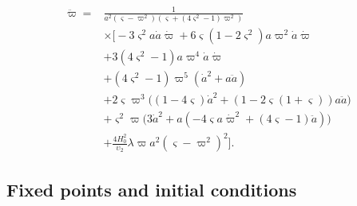 \documentclass[aps,prd,reprint,preprintnumbers,showpacs,floatfix,nofootinbib,superscriptaddress]{revtex4-2}
\newcommand{\cpr}{\varpi}
\begin{document}
\begin{align}
	\ddot{\cpr} ={}& \frac{1}{a^2\left(\varsigma-\cpr^2\right)\left(\varsigma+\left(4\varsigma^2-1\right)\cpr^2\right)} \nonumber\\
	& \times \Bigg[-3\varsigma^2 a \dot a \dot{\cpr} + 6\varsigma\left(1-2\varsigma^2\right)a\cpr^2\dot a\dot{\cpr} \nonumber\\
	& +3\left(4\varsigma^2-1\right)a\cpr^4\dot a\dot{\cpr} \nonumber\\
	& +\left(4\varsigma^2-1\right)\cpr^5\left(\dot a^2+a\ddot a\right) \nonumber\\
	&+2\varsigma\cpr^3\Big(\left(1-4\varsigma\right)\dot a^2+\left(1-2\varsigma(1+\varsigma)\right)a\ddot a\Big) \nonumber \\
	& +\varsigma^2\cpr\Big(3\dot a^2+a\left(-4\varsigma a\dot{\cpr}^2+\left(4\varsigma-1\right)\ddot a\right)\Big) \nonumber\\
	& + \frac{4 H_0^2}{\upsilon_2}\lambda\varpi a^2 (\varsigma - \varpi^2)^2\Bigg]. \label{eq:stigma-cpr-eom}
\end{align}

\subsection{Fixed points and initial conditions}
\end{document}
